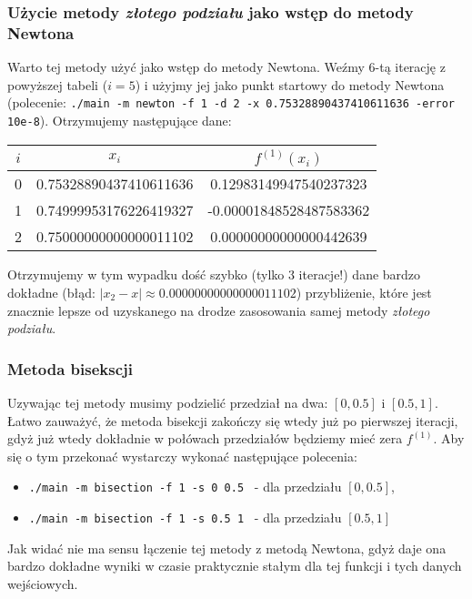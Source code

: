 \documentclass[a4paper,11pt]{article}
\begin{document}
    \subsubsection{Użycie metody \emph{złotego podziału} jako wstęp do metody Newtona}
    Warto tej metody użyć jako wstęp do metody Newtona. Weźmy 6-tą iterację z powyższej tabeli ($ i = 5 $) i użyjmy jej jako punkt startowy do metody Newtona (polecenie: \texttt{./main -m newton -f 1 -d 2 -x 0.75328890437410611636 -error 10e-8}). Otrzymujemy następujące dane:
     \begin{center}
      \begin{tabular}{S[table-format=1.0]S[table-format=-1.9]S[table-format=-1.15,table-auto-round=false]}
        \toprule
        {$i$}                & {$x_i$}               & {$f^{(1)}(x_i)$}            \\  & 0.75328890437410611636 & 0.12983149947540237323 \\
         1 & 0.74999953176226419327 & -0.00001848528487583362 \\
         2 & 0.75000000000000011102 & 0.00000000000000442639 \\ \bottomrule
      \end{tabular}
    \end{center}
  Otrzymujemy w tym wypadku dość szybko (tylko 3 iteracje!) dane bardzo dokładne (błąd: $ |x_2 - x| \approx 0.00000000000000011102 $) przybliżenie, które jest znacznie lepsze od uzyskanego na drodze zasosowania samej metody \emph{złotego podziału}. 
    
  \subsubsection{Metoda bisekscji}
  Uzywając tej metody musimy podzielić przedział na dwa: $ [0, 0.5] $ i $ [0.5, 1]$. Łatwo zauważyć, że metoda bisekcji zakończy się wtedy już po pierwszej iteracji, gdyż już wtedy dokładnie w połówach przedziałów będziemy mieć zera $f^{(1)}$. Aby się o tym przekonać wystarczy wykonać następujące polecenia:
  \begin{itemize}
    \item \texttt{./main -m bisection -f 1 -s 0 0.5 } - dla przedziału $[0, 0.5]$,
    \item \texttt{./main -m bisection -f 1 -s 0.5 1 } - dla przedziału $[0.5, 1]$
  \end{itemize}
  Jak widać nie ma sensu łączenie tej metody z metodą Newtona, gdyż daje ona bardzo dokładne wyniki w czasie praktycznie stałym dla tej funkcji i tych danych wejściowych.
  
\end{document}

